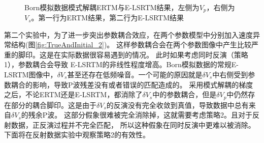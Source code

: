 \begin{figure}[!htb]
   \centering
   \\
   \caption{Born模拟数据模式解耦ERTM与E-LSRTM结果，左侧为$V_p$，右侧为$V_s$。第一行为ERTM结果，第二行为E-LSRTM结果}
   \label{fig:decomp_2}
\end{figure}
第二个实验中，为了进一步突出参数耦合效应，在两个参数模型中分别加入速度异常结构(图\ref{fig:TrueAndInitial_2})。
这样参数耦合会在两个参数图像中产生比较严重的脚印。这是在实际数据很容易遇到的情况。
此时如果考虑同时反演（策略1），参数耦合会导致
E-LSRTM的非线性程度增高。Born模拟数据的常规E-LSRTM图像中，$\delta
V_s$甚至还存在低频噪音。一个可能的原因就是$\delta V_s$中右侧受到参数耦合的影响，导致P波残差没有或者错误的匹配造成的。
采用模式解耦的梯度之后，不论ERTM还是E-LSRTM，都消除了$\delta
V_s$中的参数耦合，但是$\delta
V_p$中仍然存在部分的耦合脚印。这是由于$\delta
V_s$的反演没有完全收敛到真值，导致数据中总有来自$\delta V_s$的残余P波。
这部分假象很难被完全消除掉，这就需要考虑策略2。且对于反射数据，正反演过程并不完全匹配，
所以这种假象在同时反演中更难以被消除。下面将在反射数据实验中观察策略2的有效性。

